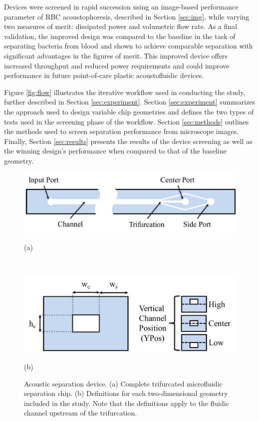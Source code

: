 Devices were screened in rapid succession using an image-based performance parameter of RBC acoustophoresis,  described in Section \ref{sec:img}, while varying two measures of merit: dissipated power and volumetric flow rate. As a final validation, the improved design was compared to the baseline in the task of separating bacteria from blood and shown to achieve comparable separation with significant advantages in the figures of merit. This improved device offers increased throughput and reduced power requirements and could improve performance in future point-of-care plastic acoustofluidic devices.

Figure \ref{fig:flow} illustrates the iterative workflow used in conducting the study, further described in Section \ref{sec:experiment}. Section \ref{sec:experiment} summarizes the approach used to design variable chip geometries and defines the two types of tests used in the screening phase of the workflow. Section \ref{sec:methods} outlines the methods used to screen separation performance from microscope images. Finally, Section \ref{sec:results} presents the results of the device screening as well as the winning design's performance when compared to that of the baseline geometry. 

\begin{figure}[htb]
  \begin{minipage}[t]{0.99\linewidth}\centering
    \includegraphics[width=14cm]{chip}
    \medskip
    \centerline{(a)}
  \end{minipage}\hfill\\
  \begin{minipage}[t]{0.99\linewidth}\centering
    \includegraphics[width=14cm]{2D}
    \medskip
    \centerline{(b)}
  \end{minipage}
  \caption[Acoustofluidic separation device and 2D geometric definitions]{Acoustic separation device. (a) Complete trifurcated microfluidic separation chip. (b) Definitions for each two-dimensional geometry included in the study. Note that the definitions apply to the fluidic channel upstream of the trifurcation.} 
  \label{fig:geometry}
\end{figure}


